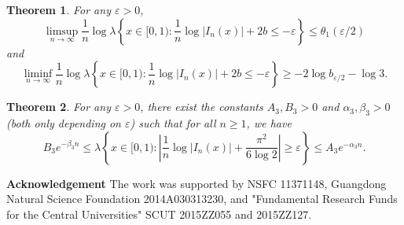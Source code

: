 \documentclass[reqno]{amsart}
\newtheorem{theorem}{Theorem}[section]
\theoremstyle{definition}
\numberwithin{equation}{section}
\begin{document}
\begin{theorem}
For any $\varepsilon >0$,
\begin{equation*}
\limsup_{n \to \infty} \frac{1}{n}\log \lambda\left\{x\in [0,1):\frac{1}{n}\log |I_n(x)| + 2b \leq - \varepsilon\right\} \leq \theta_1(\varepsilon/2)
\end{equation*}
 and
\begin{equation*}
\liminf_{n \to \infty} \frac{1}{n}\log \lambda\left\{x\in [0,1):\frac{1}{n}\log |I_n(x)| + 2b \leq -\varepsilon\right\} \geq -2\log b_{\varepsilon/2}-\log 3.
\end{equation*}
\end{theorem}

\begin{theorem}\label{Diophantine}
For any $\varepsilon > 0$, there exist the constants $A_3, B_3> 0$ and $\alpha_3, \beta_3 > 0$ (both only depending on $\varepsilon$) such that for all $n \geq 1$, we have
\begin{equation*}
B_3e^{-\beta_3 n} \leq \lambda \left\{x \in [0,1):\left|\frac{1}{n}\log |I_n(x)| + \frac{\pi^2}{6\log2}\right| \geq \varepsilon\right\} \leq A_3e^{-\alpha_3 n}.
\end{equation*}
\end{theorem}

{\bf Acknowledgement}
The work was supported by NSFC 11371148, Guangdong Natural Science Foundation 2014A030313230, and "Fundamental Research Funds for the Central Universities" SCUT 2015ZZ055 and 2015ZZ127.
\end{document}
